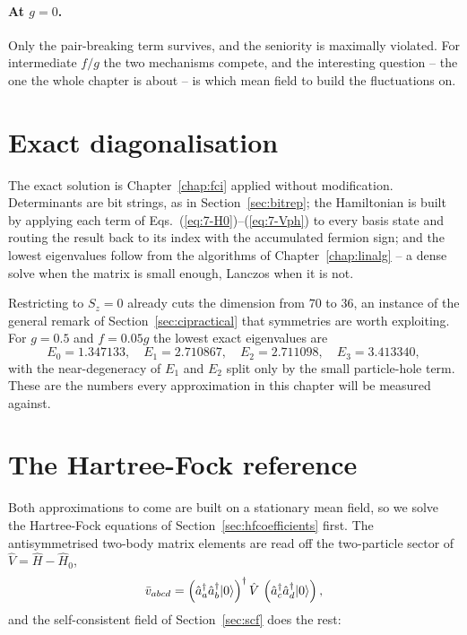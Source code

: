 \paragraph{At $g=0$.}
Only the pair-breaking term survives, and the seniority is maximally violated.
For intermediate $f/g$ the two mechanisms compete, and the interesting
question -- the one the whole chapter is about -- is which mean field to build
the fluctuations on.

\section{Exact diagonalisation}
\label{sec:phexact}

The exact solution is Chapter~\ref{chap:fci} applied without modification.
Determinants are bit strings, as in Section~\ref{sec:bitrep}; the Hamiltonian
is built by applying each term of Eqs.~(\ref{eq:7-H0})--(\ref{eq:7-Vph}) to
every basis state and routing the result back to its index with the
accumulated fermion sign; and the lowest eigenvalues follow from the
algorithms of Chapter~\ref{chap:linalg} -- a dense solve when the matrix is
small enough, Lanczos when it is not.

Restricting to $S_z=0$ already cuts the dimension from $70$ to $36$, an
instance of the general remark of Section~\ref{sec:cipractical} that
symmetries are worth exploiting.  For $g=0.5$ and $f=0.05g$ the lowest exact
eigenvalues are
\begin{equation}
  E_0=1.347133,\quad E_1=2.710867,\quad E_2=2.711098,\quad E_3=3.413340,
  \label{eq:7-exactexample}
\end{equation}
with the near-degeneracy of $E_1$ and $E_2$ split only by the small
particle-hole term.  These are the numbers every approximation in this chapter
will be measured against.

\section{The Hartree-Fock reference}
\label{sec:phhartreefock}

Both approximations to come are built on a stationary mean field, so we solve
the Hartree-Fock equations of Section~\ref{sec:hfcoefficients} first.  The
antisymmetrised two-body matrix elements are read off the two-particle sector
of $\hat{V}=\hat{H}-\hat{H}_0$,
\begin{equation}
  \bar{v}_{abcd}
   = \left(\hat{a}^{\dagger}_{a}\hat{a}^{\dagger}_{b}\vert 0 \rangle\right)^{\dagger}
     \hat{V}\,
     \left(\hat{a}^{\dagger}_{c}\hat{a}^{\dagger}_{d}\vert 0 \rangle\right),
  \label{eq:7-vbar}
\end{equation}
and the self-consistent field of Section~\ref{sec:scf} does the rest:

